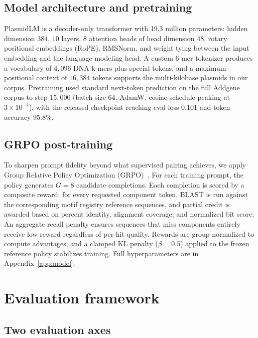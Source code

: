 \documentclass{article}
\begin{document}
\subsection{Model architecture and pretraining}
\label{sec:pretraining}

PlasmidLM is a decoder-only transformer with 19.3 million parameters: hidden dimension
$384$, $10$ layers, $8$ attention heads of head dimension $48$, rotary positional
embeddings (RoPE), RMSNorm, and weight tying between the input embedding and the
language modeling head. A custom 6-mer tokenizer produces a vocabulary of $4{,}096$ DNA
k-mers plus special tokens, and a maximum positional context of $16{,}384$ tokens
supports the multi-kilobase plasmids in our corpus. Pretraining used standard
next-token prediction on the full Addgene corpus to step $15{,}000$ (batch size $64$,
AdamW, cosine schedule peaking at $3\times10^{-4}$), with the released checkpoint
reaching eval loss $0.101$ and token accuracy $95.8\%$.

\subsection{GRPO post-training}
\label{sec:grpo}

To sharpen prompt fidelity beyond what supervised pairing achieves, we apply Group
Relative Policy Optimization (GRPO)~\citep{shao2024deepseekmath}. For each training
prompt, the policy generates $G=8$ candidate completions. Each completion is scored by a
composite reward: for every requested component token, BLAST is run against the
corresponding motif registry reference sequences, and partial credit is awarded based on
percent identity, alignment coverage, and normalized bit score. An aggregate recall
penalty ensures sequences that miss components entirely receive low reward regardless of
per-hit quality. Rewards are group-normalized to compute advantages, and a clamped KL
penalty ($\beta=0.5$) applied to the frozen reference policy stabilizes training. Full
hyperparameters are in Appendix~\ref{app:model}.

\section{Evaluation framework}
\label{sec:eval}

\subsection{Two evaluation axes}
\label{sec:eval-axes}
\end{document}
